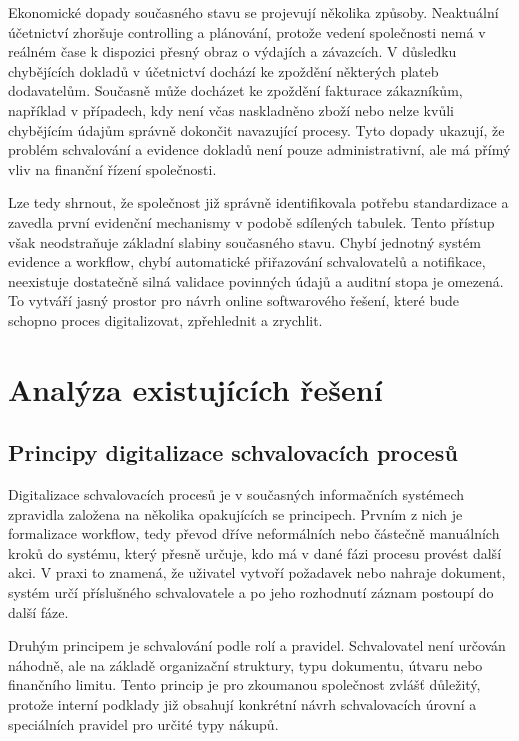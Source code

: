 Ekonomické dopady současného stavu se projevují několika způsoby. Neaktuální účetnictví zhoršuje controlling a plánování, protože vedení společnosti nemá v reálném čase k dispozici přesný obraz o výdajích a závazcích. V důsledku chybějících dokladů v účetnictví dochází ke zpoždění některých plateb dodavatelům. Současně může docházet ke zpoždění fakturace zákazníkům, například v případech, kdy není včas naskladněno zboží nebo nelze kvůli chybějícím údajům správně dokončit navazující procesy. Tyto dopady ukazují, že problém schvalování a evidence dokladů není pouze administrativní, ale má přímý vliv na finanční řízení společnosti.

Lze tedy shrnout, že společnost již správně identifikovala potřebu standardizace a zavedla první evidenční mechanismy v podobě sdílených tabulek. Tento přístup však neodstraňuje základní slabiny současného stavu. Chybí jednotný systém evidence a workflow, chybí automatické přiřazování schvalovatelů a notifikace, neexistuje dostatečně silná validace povinných údajů a auditní stopa je omezená. To vytváří jasný prostor pro návrh online softwarového řešení, které bude schopno proces digitalizovat, zpřehlednit a zrychlit.


\chapter{Analýza existujících řešení}


\section{Principy digitalizace schvalovacích procesů}

Digitalizace schvalovacích procesů je v současných informačních systémech zpravidla založena na několika opakujících se principech. Prvním z nich je formalizace workflow, tedy převod dříve neformálních nebo částečně manuálních kroků do systému, který přesně určuje, kdo má v dané fázi procesu provést další akci. V praxi to znamená, že uživatel vytvoří požadavek nebo nahraje dokument, systém určí příslušného schvalovatele a po jeho rozhodnutí záznam postoupí do další fáze.

Druhým principem je schvalování podle rolí a pravidel. Schvalovatel není určován náhodně, ale na základě organizační struktury, typu dokumentu, útvaru nebo finančního limitu. Tento princip je pro zkoumanou společnost zvlášť důležitý, protože interní podklady již obsahují konkrétní návrh schvalovacích úrovní a speciálních pravidel pro určité typy nákupů.

